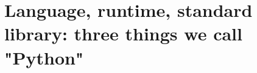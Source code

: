 \chapter{Language, runtime, standard library: three things we call "Python"}
\label{ch:language-runtime-standard-library-three}

